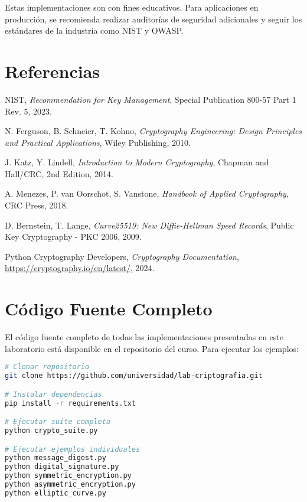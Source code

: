 \documentclass[12pt,a4paper]{article}
\begin{document}
\begin{securityalert}
	Estas implementaciones son con fines educativos. Para aplicaciones en producción, se recomienda realizar auditorías de seguridad adicionales y seguir los estándares de la industria como NIST y OWASP.
\end{securityalert}

\section{Referencias}

\begin{thebibliography}{9}

	NIST,
	\textit{Recommendation for Key Management},
	Special Publication 800-57 Part 1 Rev. 5,
	2023.

	N. Ferguson, B. Schneier, T. Kohno,
	\textit{Cryptography Engineering: Design Principles and Practical Applications},
	Wiley Publishing,
	2010.

	J. Katz, Y. Lindell,
	\textit{Introduction to Modern Cryptography},
	Chapman and Hall/CRC,
	2nd Edition, 2014.

	A. Menezes, P. van Oorschot, S. Vanstone,
	\textit{Handbook of Applied Cryptography},
	CRC Press,
	2018.

	D. Bernstein, T. Lange,
	\textit{Curve25519: New Diffie-Hellman Speed Records},
	Public Key Cryptography - PKC 2006,
	2009.

	Python Cryptography Developers,
	\textit{Cryptography Documentation},
	\url{https://cryptography.io/en/latest/},
	2024.

\end{thebibliography}

\appendix

\section{Código Fuente Completo}

El código fuente completo de todas las implementaciones presentadas en este laboratorio está disponible en el repositorio del curso. Para ejecutar los ejemplos:

\begin{lstlisting}[language=bash, caption=Instalación y ejecución]
# Clonar repositorio
git clone https://github.com/universidad/lab-criptografia.git

# Instalar dependencias
pip install -r requirements.txt

# Ejecutar suite completa
python crypto_suite.py

# Ejecutar ejemplos individuales
python message_digest.py
python digital_signature.py
python symmetric_encryption.py
python asymmetric_encryption.py
python elliptic_curve.py
\end{lstlisting}
\end{document}
